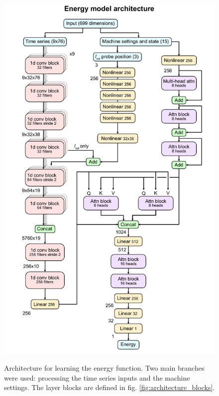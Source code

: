 \begin{figure}
	\centering
	\includegraphics[height=550pt]{figures/architecture.pdf}
	\caption[EBM neural network architecture]{\label{fig:architecture}Architecture for learning the energy function. Two main branches were used: processing the time series inputs and the machine settings. The layer blocks are defined in fig. \ref{fig:architecture_blocks}.}
\end{figure}

